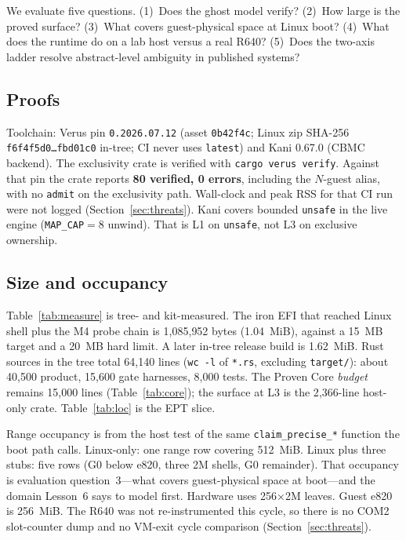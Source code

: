 \documentclass[sigplan,10pt,anonymous]{acmart}
\begin{document}
We evaluate five questions. (1)~Does the ghost model verify? (2)~How
large is the proved surface? (3)~What covers guest-physical space at Linux
boot? (4)~What does the runtime do on a lab host versus a real R640?
(5)~Does the two-axis ladder resolve abstract-level ambiguity in published
systems?

\subsection{Proofs}

Toolchain: Verus pin \texttt{0.2026.07.12} (asset \texttt{0b42f4c};
Linux zip SHA-256 \texttt{f6f4f5d0\ldots fbd01c0} in-tree; CI never uses
\texttt{latest}) and Kani 0.67.0 (CBMC backend).
The exclusivity crate is verified with \texttt{cargo verus verify}.
Against that pin the crate reports \textbf{80 verified, 0 errors},
including the $N$-guest alias, with no \texttt{admit} on the exclusivity
path. Wall-clock and peak RSS for that CI run were not logged
(Section~\ref{sec:threats}).
Kani covers bounded \texttt{unsafe} in the live engine
(\texttt{MAP\_CAP}${}=8$ unwind). That is L1 on \texttt{unsafe}, not L3
on exclusive ownership.

\subsection{Size and occupancy}

Table~\ref{tab:measure} is tree- and kit-measured. The iron EFI that
reached Linux shell plus the M4 probe chain is 1{,}085{,}952 bytes
(1.04~MiB), against a 15~MB target and a 20~MB hard limit. A later
in-tree release build is 1.62~MiB. Rust sources in the tree total 64{,}140
lines (\texttt{wc -l} of \texttt{*.rs}, excluding \texttt{target/}): about
40{,}500 product, 15{,}600 gate harnesses, 8{,}000 tests. The Proven Core
\emph{budget} remains 15{,}000 lines (Table~\ref{tab:core}); the surface
at L3 is the 2{,}366-line host-only crate. Table~\ref{tab:loc} is the EPT
slice.

Range occupancy is from the host test of the same
\texttt{claim\_precise\_*} function the boot path calls. Linux-only:
one range row covering 512~MiB. Linux plus three stubs: five rows (G0 below
e820, three 2M shells, G0 remainder). That occupancy is evaluation
question~3---what covers guest-physical space at boot---and the domain
Lesson~6 says to model first. Hardware uses 256$\times$2M leaves. Guest e820
is 256~MiB. The R640 was not re-instrumented this cycle, so there is no
COM2 slot-counter dump and no VM-exit cycle comparison
(Section~\ref{sec:threats}).
\end{document}

